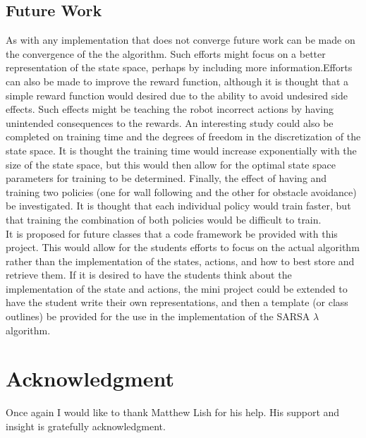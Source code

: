\documentclass[conference]{IEEEtran}
\begin{document}
\subsection{Future Work}
As with any implementation that does not converge future work can be made on the convergence of the the algorithm.
Such efforts might focus on a better representation of the state space, perhaps by including more information.Efforts can also be made to improve the reward function, although it is thought that a simple reward function would desired due to the ability to avoid undesired side effects.
Such effects might be teaching the robot incorrect actions by having unintended consequences to the rewards. 
An interesting study could also be completed on training time and the degrees of freedom in the discretization of the state space.
It is thought the training time would increase exponentially with the size of the state space, but this would then allow for the optimal state space parameters for training to be determined.
Finally, the effect of having and training two policies (one for wall following and the other for obstacle avoidance) be investigated.  
It is thought that each individual policy would train faster, but that training the combination of both policies would be difficult to train.
\\
It is proposed for future classes that a code framework be provided with this project. 
This would allow for the students efforts to focus on the actual algorithm rather than the implementation of the states, actions, and how to best store and retrieve them.  If it is desired to have the students think about the implementation of the state and actions, the mini project could be extended to have the student write their own representations, and then a template (or class outlines) be provided for the use in the implementation of the SARSA $\lambda$ algorithm.


\section*{Acknowledgment}
Once again I would like to thank Matthew Lish for his help.  His support and insight is gratefully acknowledgment.






\end{document}

